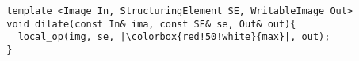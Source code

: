 \documentclass[varwidth=12cm, border={0.1cm 0.1cm 0.1cm 0.1cm}]{standalone}
\begin{document}
\begin{verbatim}
  template <Image In, StructuringElement SE, WritableImage Out>
  void dilate(const In& ima, const SE& se, Out& out){
    local_op(img, se, |\colorbox{red!50!white}{max}|, out);
  }
\end{verbatim}
\end{document}
